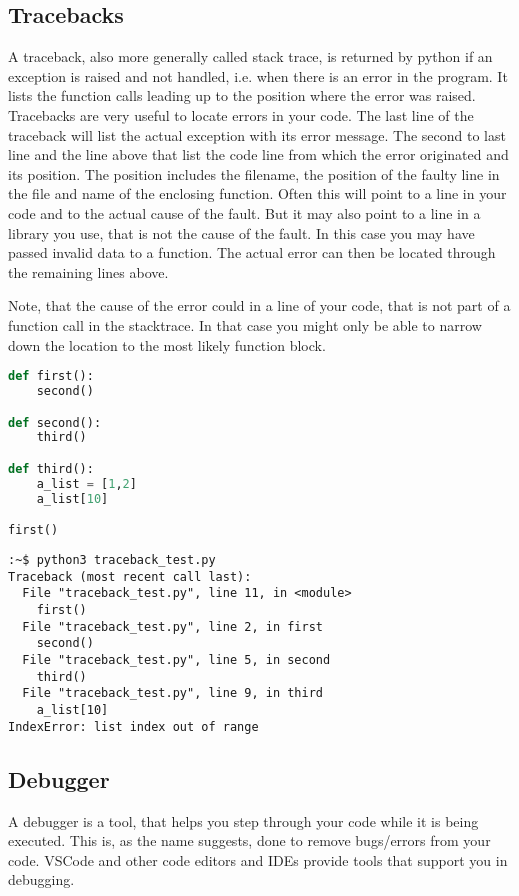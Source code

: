 \documentclass{article}
\begin{document}
\subsection{Tracebacks}

A traceback, also more generally called stack trace, is returned by python if
an exception is raised and not handled, i.e. when there is an error in the program.
It lists the function calls leading up to the position where the error was raised.
Tracebacks are very useful to locate errors in your code.
The last line of the traceback will list the actual exception with its error message.
The second to last line and the line above that list the code line from which the error
originated and its position.
The position includes the filename,
the position of the faulty line in the file and name of the enclosing function.
Often this will point to a line in your code and to the actual cause of the fault.
But it may also point to a line in a library you use, that is not the cause of the
fault.
In this case you may have passed invalid data to a function.
The actual error can then be located through the remaining lines above.

Note, that the cause of the error could in a line of your code, that is not part of
a function call in the stacktrace.
In that case you might only be able to narrow down the location to the most
likely function block.


\begin{lstlisting}[language=python]
def first():
    second()

def second():
    third()

def third():
    a_list = [1,2]
    a_list[10]

first()
\end{lstlisting}

\begin{lstlisting}
:~$ python3 traceback_test.py 
Traceback (most recent call last):
  File "traceback_test.py", line 11, in <module>
    first()
  File "traceback_test.py", line 2, in first
    second()
  File "traceback_test.py", line 5, in second
    third()
  File "traceback_test.py", line 9, in third
    a_list[10]
IndexError: list index out of range
\end{lstlisting}

\subsection{Debugger}

A debugger is a tool, that helps you step through your code while it is being executed.
This is, as the name suggests, done to remove bugs/errors from your code.
VSCode and other code editors and IDEs provide tools that support you in debugging.
\end{document}
